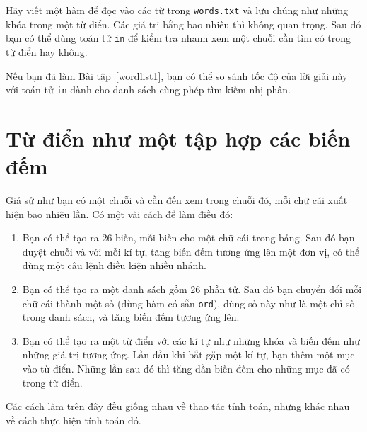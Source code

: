 \documentclass[11pt]{book}
\begin{document}

\begin{ex}
\label{wordlist2}


Hãy viết một hàm để đọc vào các từ trong {\tt words.txt} và lưu chúng
như những khóa trong một từ điển. Các giá trị bằng bao nhiêu thì
không quan trọng. Sau đó bạn có thể dùng toán tử {\tt in} để kiểm
tra nhanh xem một chuỗi cần tìm có trong từ điển hay không.

Nếu bạn đã làm Bài tập~\ref{wordlist1}, bạn có thể so sánh tốc độ
của lời giải này với toán tử {\tt in} dành cho danh sách cùng phép
tìm kiếm nhị phân.

\end{ex}


\section{Từ điển như một tập hợp các biến đếm}
\label{histogram}


Giả sử như bạn có một chuỗi và cần đến xem trong chuỗi đó, mỗi chữ cái
xuất hiện bao nhiêu lần. Có một vài cách để làm điều đó:

\begin{enumerate}

\item Bạn có thể tạo ra 26 biến, mỗi biến cho một chữ cái trong bảng.
Sau đó bạn duyệt chuỗi và với mỗi kí tự, tăng biến đếm tương ứng lên
một đơn vị, có thể dùng một câu lệnh điều kiện nhiều nhánh.

\item Bạn có thể tạo ra một danh sách gồm 26 phần tử. Sau đó bạn
chuyển đổi mỗi chữ cái thành một số (dùng hàm có sẵn 
{\tt ord}), dùng số này như là một chỉ số trong danh sách, và
tăng biến đếm tương ứng lên.

\item Bạn có thể tạo ra một từ điển với các kí tự như những khóa
và biến đếm như những giá trị tương ứng. Lần đầu khi bắt gặp một
kí tự, bạn thêm một mục vào từ điển. Những lần sau đó thì tăng
dần biến đếm cho những mục đã có trong từ điển.

\end{enumerate}

Các cách làm trên đây đều giống nhau về thao tác tính toán, nhưng
khác nhau về cách thực hiện tính toán đó.

\end{document}
